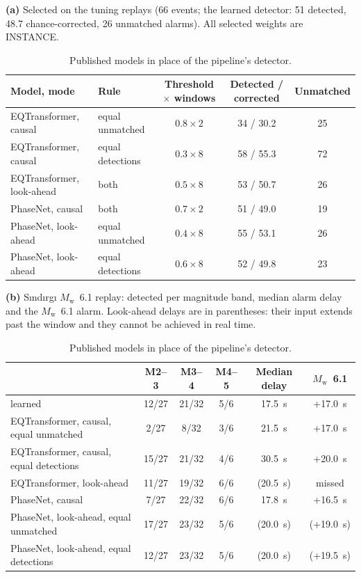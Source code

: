 \documentclass[11pt,a4paper]{article}
\newcommand{\Mw}{$M_\mathrm{w}$}
\newcommand{\panel}[1]{\par\smallskip\noindent\textbf{(#1)}\enskip}
\begin{document}
\begin{table}[htbp]
  \centering\footnotesize\setlength{\tabcolsep}{4pt}
  \caption{Published models in place of the pipeline's detector.}\label{t:seisbench}
  \panel{a} Selected on the tuning replays (66 events; the learned detector: 51
  detected, 48.7 chance-corrected, 26 unmatched alarms). All selected weights are
  INSTANCE.\par\smallskip
  \begin{tabular}{@{}llccc@{}}
    \toprule
    Model, mode & Rule & Threshold $\times$ windows & Detected / corrected & Unmatched \\
    \midrule
    EQTransformer, causal & equal unmatched & $0.8 \times 2$ & 34 / 30.2 & 25 \\
    EQTransformer, causal & equal detections & $0.3 \times 8$ & 58 / 55.3 & 72 \\
    EQTransformer, look-ahead & both & $0.5 \times 8$ & 53 / 50.7 & 26 \\
    PhaseNet, causal & both & $0.7 \times 2$ & 51 / 49.0 & 19 \\
    PhaseNet, look-ahead & equal unmatched & $0.4 \times 8$ & 55 / 53.1 & 26 \\
    PhaseNet, look-ahead & equal detections & $0.6 \times 8$ & 52 / 49.8 & 23 \\
    \bottomrule
  \end{tabular}

  \bigskip
  \panel{b} S\i{}nd\i{}rg\i{} \Mw{}~6.1 replay: detected per magnitude band, median alarm delay and
  the \Mw{}~6.1 alarm. Look-ahead delays are in parentheses: their input extends
  past the window and they cannot be achieved in real time.\par\smallskip
  \begin{tabular}{@{}lccccc@{}}
    \toprule
    & M2--3 & M3--4 & M4--5 & Median delay & \Mw{}~6.1 \\
    \midrule
    learned & 12/27 & 21/32 & 5/6 & 17.5~s & +17.0~s \\
    EQTransformer, causal, equal unmatched & 2/27 & 8/32 & 3/6 & 21.5~s & +17.0~s \\
    EQTransformer, causal, equal detections & 15/27 & 21/32 & 4/6 & 30.5~s & +20.0~s \\
    EQTransformer, look-ahead & 11/27 & 19/32 & 6/6 & (20.5~s) & missed \\
    PhaseNet, causal & 7/27 & 22/32 & 6/6 & 17.8~s & +16.5~s \\
    PhaseNet, look-ahead, equal unmatched & 17/27 & 23/32 & 5/6 & (20.0~s) & (+19.0~s) \\
    PhaseNet, look-ahead, equal detections & 12/27 & 23/32 & 5/6 & (20.0~s) & (+19.5~s) \\
    \bottomrule
  \end{tabular}


\end{table}
\end{document}
